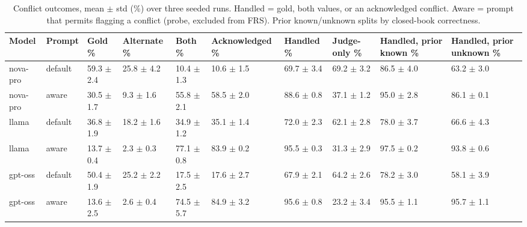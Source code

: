 \begin{table}[t]
\centering
\caption{Conflict outcomes, mean $\pm$ std (\%) over three seeded runs. Handled = gold, both values, or an acknowledged conflict. Aware = prompt that permits flagging a conflict (probe, excluded from FRS). Prior known/unknown splits by closed-book correctness.}
\small
\begin{tabular}{llllllllll}
\toprule
Model & Prompt & Gold \% & Alternate \% & Both \% & Acknowledged \% & Handled \% & Judge-only \% & Handled, prior known \% & Handled, prior unknown \% \\
\midrule
nova-pro & default & 59.3 $\pm$ 2.4 & 25.8 $\pm$ 4.2 & 10.4 $\pm$ 1.3 & 10.6 $\pm$ 1.5 & 69.7 $\pm$ 3.4 & 69.2 $\pm$ 3.2 & 86.5 $\pm$ 4.0 & 63.2 $\pm$ 3.0 \\
nova-pro & aware & 30.5 $\pm$ 1.7 & 9.3 $\pm$ 1.6 & 55.8 $\pm$ 2.1 & 58.5 $\pm$ 2.0 & 88.6 $\pm$ 0.8 & 37.1 $\pm$ 1.2 & 95.0 $\pm$ 2.8 & 86.1 $\pm$ 0.1 \\
llama & default & 36.8 $\pm$ 1.9 & 18.2 $\pm$ 1.6 & 34.9 $\pm$ 1.2 & 35.1 $\pm$ 1.4 & 72.0 $\pm$ 2.3 & 62.1 $\pm$ 2.8 & 78.0 $\pm$ 3.7 & 66.6 $\pm$ 4.3 \\
llama & aware & 13.7 $\pm$ 0.4 & 2.3 $\pm$ 0.3 & 77.1 $\pm$ 0.8 & 83.9 $\pm$ 0.2 & 95.5 $\pm$ 0.3 & 31.3 $\pm$ 2.9 & 97.5 $\pm$ 0.2 & 93.8 $\pm$ 0.6 \\
gpt-oss & default & 50.4 $\pm$ 1.9 & 25.2 $\pm$ 2.2 & 17.5 $\pm$ 2.5 & 17.6 $\pm$ 2.7 & 67.9 $\pm$ 2.1 & 64.2 $\pm$ 2.6 & 78.2 $\pm$ 3.0 & 58.1 $\pm$ 3.9 \\
gpt-oss & aware & 13.6 $\pm$ 2.5 & 2.6 $\pm$ 0.4 & 74.5 $\pm$ 5.7 & 84.9 $\pm$ 3.2 & 95.6 $\pm$ 0.8 & 23.2 $\pm$ 3.4 & 95.5 $\pm$ 1.1 & 95.7 $\pm$ 1.1 \\
\bottomrule
\end{tabular}
\end{table}
